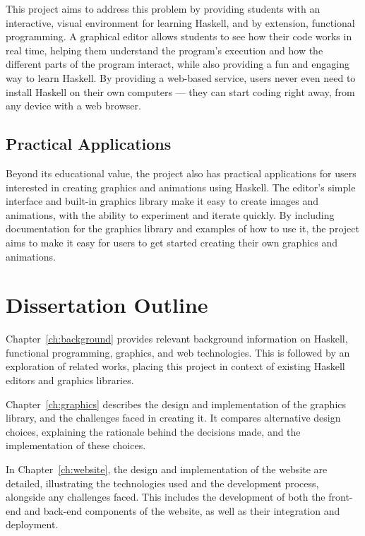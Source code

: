 \documentclass[../main.tex]{subfiles}
\begin{document}
            This project aims to address this problem by providing students with an
                interactive, visual environment for learning Haskell, and by extension,
                functional programming.
            A graphical editor allows students to see how their code works in real time,
                helping them understand the program's execution and how the different parts of
                the program interact, while also providing a fun and engaging way to learn
                Haskell.
            By providing a web-based service, users never even need to install Haskell on
                their own computers — they can start coding right away, from any device with a
                web browser.

        \subsection{Practical Applications}
            Beyond its educational value, the project also has practical applications for
                users interested in creating graphics and animations using Haskell.
            The editor's simple interface and built-in graphics library make it easy to
                create images and animations, with the ability to experiment and iterate
                quickly.
            By including documentation for the graphics library and examples of how to use
                it, the project aims to make it easy for users to get started creating their
                own graphics and animations.

    \section{Dissertation Outline}
        Chapter~\ref{ch:background} provides relevant background information on
            Haskell, functional programming, graphics, and web technologies.
        This is followed by an exploration of related works, placing this project in
            context of existing Haskell editors and graphics libraries.

        Chapter~\ref{ch:graphics} describes the design and implementation of the
            graphics library, and the challenges faced in creating it.
        It compares alternative design choices, explaining the rationale behind the
            decisions made, and the implementation of these choices.

        In Chapter~\ref{ch:website}, the design and implementation of the website are
            detailed, illustrating the technologies used and the development process,
            alongside any challenges faced.
        This includes the development of both the front-end and back-end components of
            the website, as well as their integration and deployment.
\end{document}
